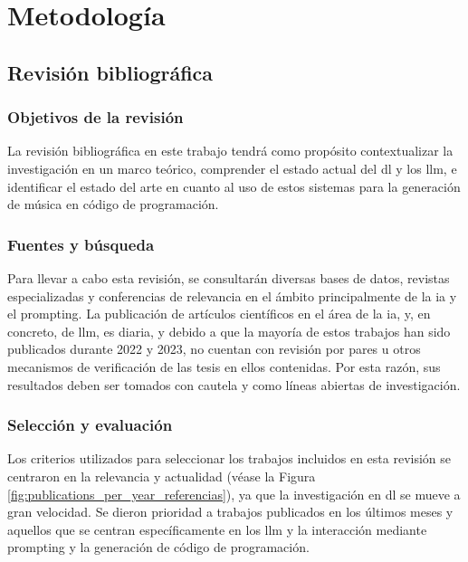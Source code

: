 \chapter{Metodología}





\section{Revisión bibliográfica}

\subsection{Objetivos de la revisión}
La revisión bibliográfica en este trabajo tendrá como propósito contextualizar la investigación en un marco teórico, comprender el estado actual del \gls{dl} y los \gls{llm}, e identificar el estado del arte en cuanto al uso de estos sistemas para la generación de música en código de programación.

\subsection{Fuentes y búsqueda}
Para llevar a cabo esta revisión, se consultarán diversas bases de datos, revistas especializadas y conferencias de relevancia en el ámbito principalmente de la \gls{ia} y el prompting. La publicación de artículos científicos en el área de la \gls{ia}, y, en concreto, de \gls{llm}, es diaria, y debido a que la mayoría de estos trabajos han sido publicados durante 2022 y 2023, no cuentan con revisión por pares u otros mecanismos de verificación de las tesis en ellos contenidas. Por esta razón, sus resultados deben ser tomados con cautela y como líneas abiertas de investigación.


\subsection{Selección y evaluación}
Los criterios utilizados para seleccionar los trabajos incluidos en esta revisión se centraron en la relevancia y actualidad (véase la Figura \ref{fig:publications_per_year_referencias}), ya que la investigación en \gls{dl} se mueve a gran velocidad. Se dieron prioridad a trabajos publicados en los últimos meses y aquellos que se centran específicamente en  los \gls{llm} y la interacción mediante prompting y la generación de código de programación.

